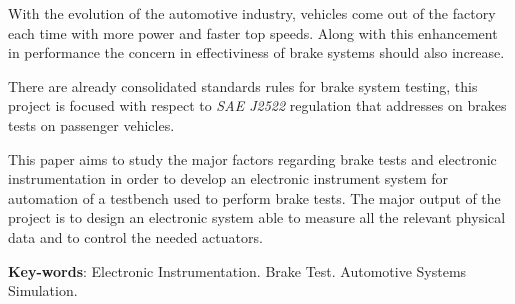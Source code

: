 \begin{resumo}

With the evolution of the automotive industry, vehicles come out of the factory each time with more power and faster top speeds. Along with this enhancement in performance the concern in effectiviness of brake systems should also increase.
\par
There are already consolidated standards rules for brake system testing, this project is focused with respect to \textit{SAE J2522} regulation that addresses on brakes tests on passenger vehicles. 
\par
This paper aims to study the major factors regarding brake tests and electronic instrumentation in order to develop an electronic instrument system for automation of a testbench used to perform brake tests. The major output of the project is to design an electronic system able to measure all the relevant physical data and to control the needed actuators.

 \vspace{\onelineskip}
    
 \noindent
   \textbf{Key-words}: Electronic Instrumentation. Brake Test. Automotive Systems Simulation.
\end{resumo}
